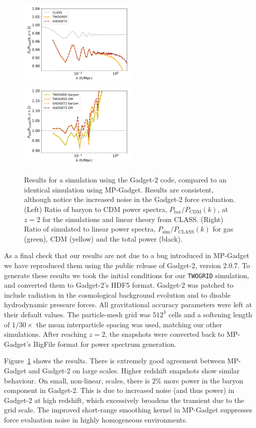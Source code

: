 \documentclass[a4paper,11pt]{article}
\begin{document}
\begin{figure}
\includegraphics[width=0.5\textwidth]{plots/gadget2_2_relpower.pdf}
\includegraphics[width=0.5\textwidth]{plots/gadget2_2_class.pdf}
\caption{Results for a simulation using the Gadget-2 code, compared to an identical simulation using MP-Gadget. Results are consistent, although notice the increased noise in the Gadget-2 force evaluation. (Left) Ratio of baryon to CDM power spectra, $P_\mathrm{bar}/P_\mathrm{CDM}(k)$, at $z=2$ for the simulations and linear theory from CLASS. (Right) Ratio of simulated to linear power spectra, $P_\mathrm{sim}/P_\mathrm{CLASS}(k)$ for gas (green), CDM (yellow) and the total power (black).}
  \label{fig:gadget2}
\end{figure}

As a final check that our results are not due to a bug introduced in MP-Gadget we have reproduced them using the public release of Gadget-2, version 2.0.7. To generate these results we took the initial conditions for our \texttt{TWOGRID} simulation, and converted them to Gadget-2's HDF5 format. Gadget-2 was patched to include radiation in the cosmological background evolution and to disable hydrodynamic pressure forces. All gravitational accuracy parameters were left at their default values. The particle-mesh grid was $512^3$ cells and a softening length of $1/30 \times$ the mean interparticle spacing was used, matching our other simulations. After reaching $z=2$, the snapshots were converted back to MP-Gadget's BigFile format for power spectrum generation.

Figure~\ref{fig:gadget2} shows the results. There is extremely good agreement between MP-Gadget and Gadget-2 on large scales.  Higher redshift snapshots show similar behaviour. On small, non-linear, scales, there is $2\%$ more power in the baryon component in Gadget-2. This is due to increased noise (and thus power) in Gadget-2 at high redshift, which excessively broadens the transient due to the grid scale. The improved short-range smoothing kernel in MP-Gadget suppresses force evaluation noise in highly homogeneous environments.



\end{document}
